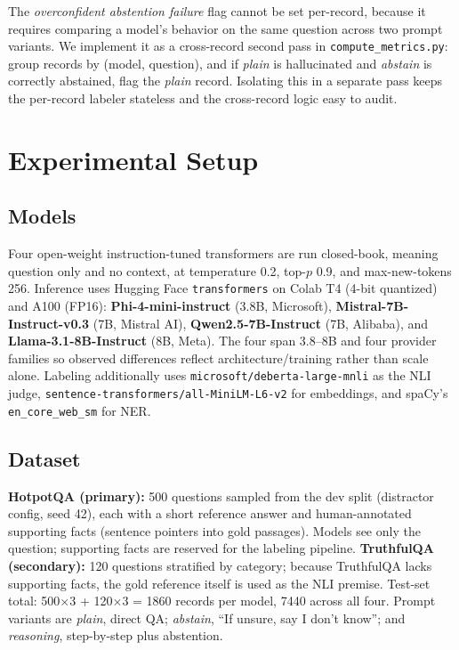 \documentclass[11pt,a4paper]{article}
\newcommand{\lbl}[1]{\textit{#1}}
\begin{document}
The \lbl{overconfident abstention failure} flag cannot be set per-record, because it requires comparing a model's behavior on the same question across two prompt variants. We implement it as a cross-record second pass in \texttt{compute\_metrics.py}: group records by (model, question), and if \lbl{plain} is hallucinated and \lbl{abstain} is correctly abstained, flag the \lbl{plain} record. Isolating this in a separate pass keeps the per-record labeler stateless and the cross-record logic easy to audit.

\section{Experimental Setup}

\subsection{Models}

Four open-weight instruction-tuned transformers are run closed-book, meaning question only and no context, at temperature 0.2, top-$p$ 0.9, and max-new-tokens 256. Inference uses Hugging Face \texttt{transformers} on Colab T4 (4-bit quantized) and A100 (FP16): \textbf{Phi-4-mini-instruct} (3.8B, Microsoft), \textbf{Mistral-7B-Instruct-v0.3} (7B, Mistral AI), \textbf{Qwen2.5-7B-Instruct} (7B, Alibaba), and \textbf{Llama-3.1-8B-Instruct} (8B, Meta). The four span 3.8--8B and four provider families so observed differences reflect architecture/training rather than scale alone. Labeling additionally uses \texttt{microsoft/deberta-large-mnli} as the NLI judge, \texttt{sentence-transformers/all-MiniLM-L6-v2} for embeddings, and spaCy's \texttt{en\_core\_web\_sm} for NER.

\subsection{Dataset}

\textbf{HotpotQA (primary):} 500 questions sampled from the dev split (distractor config, seed 42), each with a short reference answer and human-annotated supporting facts (sentence pointers into gold passages). Models see only the question; supporting facts are reserved for the labeling pipeline. \textbf{TruthfulQA (secondary):} 120 questions stratified by category; because TruthfulQA lacks supporting facts, the gold reference itself is used as the NLI premise. Test-set total: 500$\times$3 + 120$\times$3 = 1860 records per model, 7440 across all four. Prompt variants are \lbl{plain}, direct QA; \lbl{abstain}, ``If unsure, say I don't know''; and \lbl{reasoning}, step-by-step plus abstention.
\end{document}
